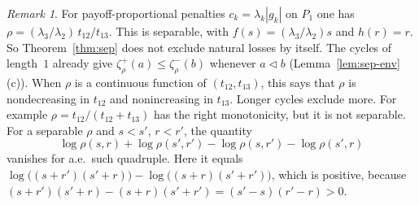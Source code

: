 \documentclass[11pt]{article}
\theoremstyle{definition}\newtheorem{definition}[theorem]{Definition}
\theoremstyle{remark}\newtheorem{remark}[theorem]{Remark}
\begin{document}
\begin{remark}\label{rem:sep-example}
For payoff-proportional penalties $c_k=\lambda_k|g_k|$ on $P_1$ one has
$\rho=(\lambda_3/\lambda_2)\,t_{12}/t_{13}$. This is separable, with
$f(s)=(\lambda_3/\lambda_2)s$ and $h(r)=r$. So Theorem~\ref{thm:sep} does
not exclude natural losses by itself. The cycles of length~$1$ already give
$\zeta_\rho^+(a)\le\zeta_\rho^-(b)$ whenever $a\lhd b$
(Lemma~\ref{lem:sep-env}(c)). When $\rho$ is a continuous function of
$(t_{12},t_{13})$, this says that $\rho$ is nondecreasing in $t_{12}$ and
nonincreasing in $t_{13}$. Longer cycles exclude more. For example
$\rho=t_{12}/(t_{12}+t_{13})$ has the right monotonicity, but it is not
separable. For a separable $\rho$ and $s<s'$, $r<r'$, the quantity
\[
 \log\rho(s,r)+\log\rho(s',r')-\log\rho(s,r')-\log\rho(s',r)
\]
vanishes for a.e.\ such quadruple. Here it equals
$\log\bigl((s+r')(s'+r)\bigr)-\log\bigl((s+r)(s'+r')\bigr)$, which is
positive, because $(s+r')(s'+r)-(s+r)(s'+r')=(s'-s)(r'-r)>0$.
\end{remark}
\end{document}
